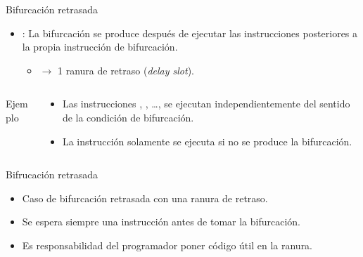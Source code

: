 \begin{frame}[t,fragile]{Bifurcación retrasada}
\begin{itemize}
  \item {}: La bifurcación se produce después de ejecutar 
        las  instrucciones posteriores a la propia instrucción 
        de bifurcación.
    \begin{itemize}
      \item {} $\rightarrow$ 
            1 ranura de retraso (\emph{delay slot}).
    \end{itemize}
\end{itemize}

\begin{columns}
\begin{column}{.4\textwidth}
\begin{block}{Ejemplo}

\end{block}
\end{column}

\begin{column}{.6\textwidth}
\begin{itemize}
  \item Las instrucciones , , \ldots,  se
        ejecutan independientemente del sentido de la condición de bifurcación.
  \item La instrucción  solamente se ejecuta si no se produce la
        bifurcación.
\end{itemize}
\end{column}
\end{columns}
\end{frame}

\begin{frame}[t]{Bifrucación retrasada}
\makebox[\textwidth][c]{

}
\begin{itemize}
  \item Caso de bifurcación retrasada con una ranura de retraso.
  \item Se espera siempre una instrucción antes de tomar la bifurcación.
  \item Es responsabilidad del programador poner código útil en la ranura.
\end{itemize}
\end{frame}

